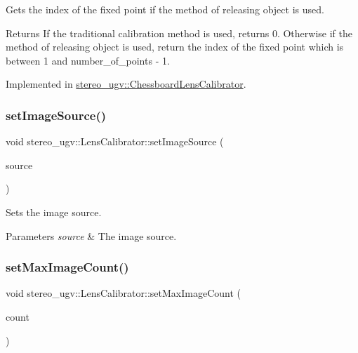 Gets the index of the fixed point if the method of releasing object is used. 

\begin{DoxyReturn}{Returns}
If the traditional calibration method is used, returns 0. Otherwise if the method of releasing object is used, return the index of the fixed point which is between 1 and number\+\_\+of\+\_\+points -\/ 1. 
\end{DoxyReturn}


Implemented in \hyperlink{classstereo__ugv_1_1ChessboardLensCalibrator_a00aa88f3399b59ec686f6d506c73a910}{stereo\+\_\+ugv\+::\+Chessboard\+Lens\+Calibrator}.

\mbox{\label{classstereo__ugv_1_1LensCalibrator_a13c279f4c0a4cc7b815340e31d5447be}} 
\subsubsection{\texorpdfstring{set\+Image\+Source()}{setImageSource()}}
{\footnotesize\ttfamily void stereo\+\_\+ugv\+::\+Lens\+Calibrator\+::set\+Image\+Source (\begin{DoxyParamCaption}\item[{std\+::unique\+\_\+ptr$<$ \hyperlink{classstereo__ugv_1_1ImageSource}{Image\+Source} $>$ \&\&}]{source }\end{DoxyParamCaption})}



Sets the image source. 


\begin{DoxyParams}{Parameters}
{\em source} & The image source. \\
\hline
\end{DoxyParams}
\mbox{\label{classstereo__ugv_1_1LensCalibrator_a8171c3a541429bd25ed64eb5140bbf2c}} 
\subsubsection{\texorpdfstring{set\+Max\+Image\+Count()}{setMaxImageCount()}}
{\footnotesize\ttfamily void stereo\+\_\+ugv\+::\+Lens\+Calibrator\+::set\+Max\+Image\+Count (\begin{DoxyParamCaption}\item[{std\+::size\+\_\+t}]{count }\end{DoxyParamCaption})}



